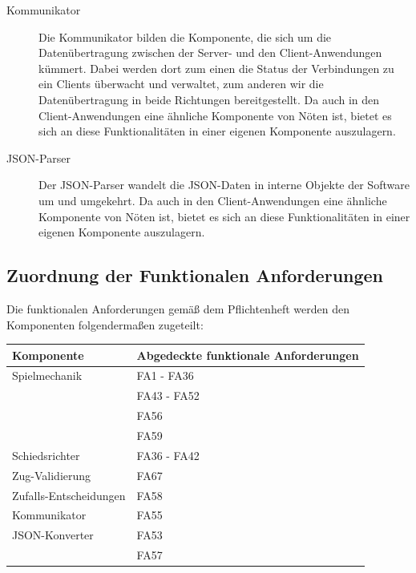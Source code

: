 \begin{description}
			\item[Kommunikator]
			Die Kommunikator bilden die Komponente, die sich um die Datenübertragung zwischen der Server- und den Client-Anwendungen kümmert. Dabei werden dort zum einen die Status der Verbindungen zu ein Clients überwacht und verwaltet, zum anderen wir die Datenübertragung in beide Richtungen bereitgestellt. Da auch in den Client-Anwendungen eine ähnliche Komponente von Nöten ist, bietet es sich an diese Funktionalitäten in einer eigenen Komponente auszulagern.
			
			\item[JSON-Parser]
			Der JSON-Parser wandelt die JSON-Daten in interne Objekte der Software um und umgekehrt. Da auch in den Client-Anwendungen eine ähnliche Komponente von Nöten ist, bietet es sich an diese Funktionalitäten in einer eigenen Komponente auszulagern.  

		\end{description}
		
	\subsection{Zuordnung der Funktionalen Anforderungen}
	
	Die funktionalen Anforderungen gemäß dem Pflichtenheft werden den Komponenten folgendermaßen zugeteilt:

	\begin{table}[h]
	\centering
	\begin{tabular}{|l|l|}
		\hline
		\textbf{Komponente} & \textbf{Abgedeckte funktionale Anforderungen}\\ \hline
		Spielmechanik & FA1 - FA36 \\
		& FA43 - FA52 \\
		& FA56 \\
		& FA59 \\ \hline
		
		Schiedsrichter & FA36 - FA42 \\ \hline
		
		Zug-Validierung & FA67 \\ \hline
		
		Zufalls-Entscheidungen & FA58 \\ \hline	
		
		Kommunikator & FA55 \\ \hline
		
		JSON-Konverter & FA53 \\
		& FA57\\ \hline

	
	\end{tabular}
	\end{table}